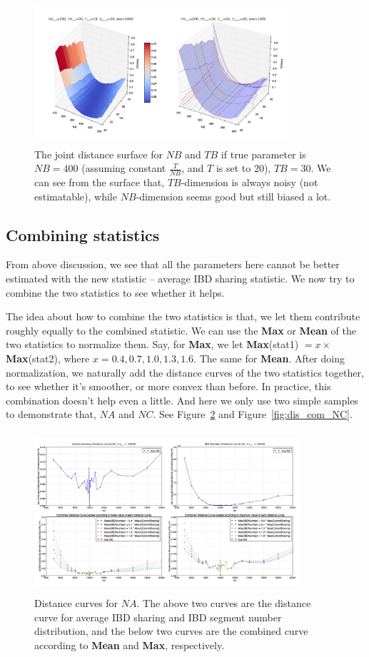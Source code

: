 \documentclass{bioinfo}
\begin{document}
\begin{figure}[h]
\centerline{\includegraphics[width=270pt, height=150pt]{like_NBTBT20_2.jpg}}
\caption{The joint distance surface for $NB$ and $TB$ if true parameter is $NB=400$ (assuming constant $\frac{T}{NB}$, and $T$ is set to $20$), $TB=30$. We can see from the surface that, $TB$-dimension is always noisy (not estimatable), while $NB$-dimension seems good but still biased a lot.}\label{fig:dis_NBTBT20}
\end{figure}


\subsection{Combining statistics}

From above discussion, we see that all the parameters here cannot be better estimated with the new statistic -- average IBD sharing statistic. We now try to combine the two statistics to see whether it helps.

The idea about how to combine the two statistics is that, we let them contribute roughly equally to the combined statistic. We can use the \textbf{Max} or \textbf{Mean} of the two statistics to normalize them. Say, for \textbf{Max}, we let \textbf{Max}(stat1) $=x \times$ \textbf{Max}(stat2), where $x=0.4,0.7,1.0,1.3,1.6$. The same for \textbf{Mean}. After doing normalization, we naturally add the distance curves of the two statistics together, to see whether it's smoother, or more convex than before. In practice, this combination doesn't help even a little. And here we only use two simple samples to demonstrate that, $NA$ and $NC$. See Figure~\ref{fig:dis_com_NA} and Figure~\ref{fig:dis_com_NC}.

\begin{figure}[h]
\centerline{\includegraphics[width=280pt, height=170pt]{like_com_NA.jpg}}
\caption{Distance curves for $NA$. The above two curves are the distance curve for average IBD sharing and IBD segment number distribution, and the below two curves are the combined curve according to \textbf{Mean} and \textbf{Max}, respectively.}\label{fig:dis_com_NA}
\end{figure}
\end{document}
